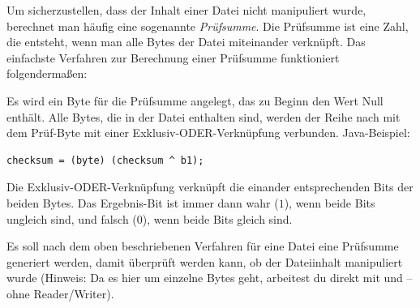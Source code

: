 Um sicherzustellen, dass der Inhalt einer Datei nicht manipuliert wurde,
berechnet man häufig eine sogenannte \emph{Prüfsumme}. Die Prüfsumme ist eine
Zahl, die entsteht, wenn man alle Bytes der Datei miteinander verknüpft. Das
einfachste Verfahren zur Berechnung einer Prüfsumme funktioniert
folgendermaßen:

Es wird ein Byte für die Prüfsumme angelegt, das zu Beginn den Wert Null
enthält. Alle Bytes, die in der Datei enthalten sind, werden der Reihe nach mit
dem Prüf-Byte mit einer Exklusiv-ODER-Verknüpfung verbunden. Java-Beispiel:

\begin{lstlisting}
checksum = (byte) (checksum ^ b1);
\end{lstlisting}

Die Exklusiv-ODER-Verknüpfung verknüpft die einander entsprechenden Bits der
beiden Bytes. Das Ergebnis-Bit ist immer dann wahr ($1$), wenn beide Bits
ungleich sind, und falsch ($0$), wenn beide Bits gleich sind.

Es soll nach dem oben beschriebenen Verfahren für eine Datei eine Prüfsumme
generiert werden, damit überprüft werden kann, ob der Dateiinhalt manipuliert
wurde (Hinweis: Da es hier um einzelne Bytes geht, arbeitest du direkt mit
 und  -- ohne Reader/Writer).

